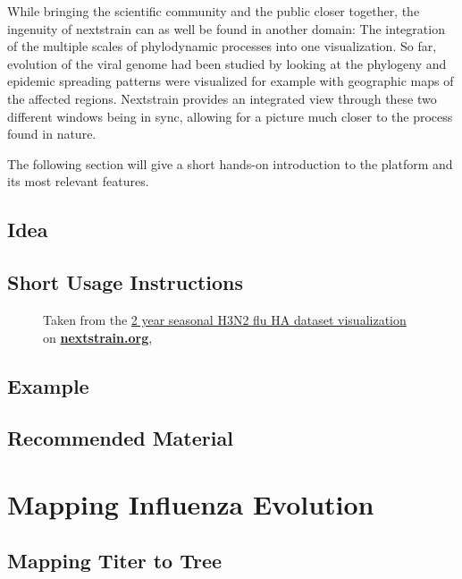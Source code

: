 \documentclass[12pt]{scrartcl}
\begin{document}
  While bringing the scientific community and the public closer together, the ingenuity of nextstrain can as well be found in another domain: The integration of the multiple scales of phylodynamic processes into one visualization. So far, evolution of the viral genome had been studied by looking at the phylogeny and epidemic spreading patterns were visualized for example with geographic maps of the affected regions. Nextstrain provides an integrated view through these two different windows being in sync, allowing for a picture much closer to the process found in nature.

  The following section will give a short hands-on introduction to the platform and its most relevant features.

  \subsection{Idea}

  \subsection{Short Usage Instructions}


  \begin{figure}[h!]
    \caption{\footnotesize Taken from the \href{https://nextstrain.org/flu/seasonal/h3n2/ha/2y?p=grid}{2 year seasonal H3N2 flu HA dataset visualization} on \href{https://nextstrain.org}{\textbf{nextstrain.org}}, \cite{leeMoncla+20}}
  \end{figure}


  \subsection{Example}

  \subsection{Recommended Material}

\section{Mapping Influenza Evolution}

  \subsection{Mapping Titer to Tree}
\end{document}
